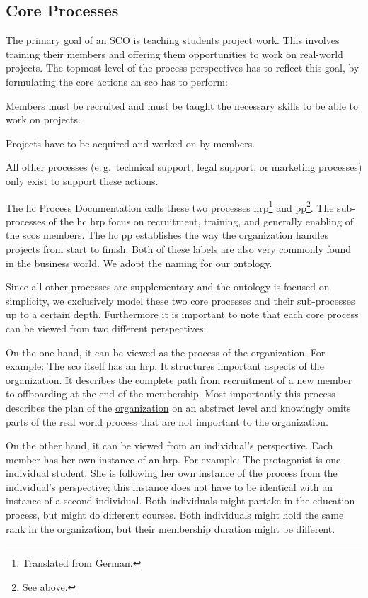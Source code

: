 \documentclass[a4paper, DIV=13, BCOR=0cm]{scrbook}
\newcommand{\eg}{e.\,g.\ }
\begin{document}
\subsection{Core Processes}
The primary goal of an SCO is teaching students project work. This involves training their members and offering them opportunities to work on real-world projects. The topmost level of the process perspectives has to reflect this goal, by formulating the core actions an \gls{sco} has to perform:
\begin{inparaenum}
	\item Members must be recruited and must be taught the necessary skills to be able to work on projects.
	\item Projects have to be acquired and worked on by members.
\end{inparaenum}
All other processes (\eg technical support, legal support, or marketing processes) only exist to support these actions.

The \gls{hc} Process Documentation \cite{hc-prozesshandbuch} calls these two processes \gls{hrp}\footnote{Translated from German.} and \gls{pp}\footnote{See above.}. The sub-processes of the \gls{hc} \gls{hrp} focus on recruitment, training, and generally enabling of the \glspl{sco} members. The \gls{hc} \gls{pp} establishes the way the organization handles projects from start to finish. Both of these labels are also very commonly found in the business world. We adopt the naming for our ontology.

Since all other processes are supplementary and the ontology is focused on simplicity, we exclusively model these two core processes and their sub-processes up to a certain depth. Furthermore it is important to note that each core process can be viewed from two different perspectives:

On the one hand, it can be viewed as the process of the organization. For example: The \gls{sco} itself has an \gls{hrp}. It structures important aspects of the organization. It describes the complete path from recruitment of a new member to offboarding at the end of the membership. Most importantly this process describes the plan of the \underline{organization} on an abstract level and knowingly omits parts of the real world process that are not important to the organization.

On the other hand, it can be viewed from an individual's perspective. Each member has her own instance of an \gls{hrp}. For example: The protagonist is one individual student. She is following her own instance of the process from the individual's perspective; this instance does not have to be identical with an instance of a second individual. Both individuals might partake in the education process, but might do different courses. Both individuals might hold the same rank in the organization, but their membership duration might be different.
\end{document}
